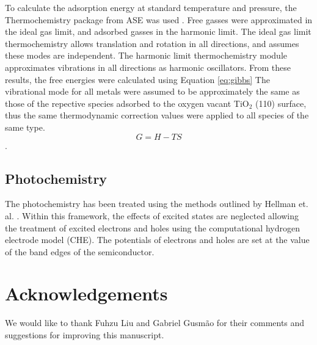 To calculate the adsorption energy at standard temperature and pressure, the Thermochemistry package from ASE was used \cite{ase-paper}. Free gasses were approximated in the ideal gas limit, and adsorbed gasses in the harmonic limit. The ideal gas limit thermochemistry allows translation and rotation in all directions, and assumes these modes are independent. The harmonic limit thermochemistry module approximates vibrations in all directions as harmonic oscillators. From these results, the free energies were calculated using Equation \ref{eq:gibbs} The vibrational mode for all metals were assumed to be approximately the same as those of the repective species adsorbed to the oxygen vacant TiO$_2$ (110) surface, thus the same thermodynamic correction values were applied to all species of the same type.
\begin{equation}
    G=H-TS
    \label{eq:gibbs}
\end{equation}. 

\subsection{Photochemistry}
The photochemistry has been treated using the methods outlined by Hellman et. al. \cite{Hellman2017}. Within this framework, the effects of excited states are neglected allowing the treatment of excited electrons and holes using the computational hydrogen electrode model (CHE). The potentials of electrons and holes are set at the value of the band edges of the semiconductor.

\section{Acknowledgements}
We would like to thank Fuhzu Liu and Gabriel Gusmão for their comments and suggestions for improving this manuscript.




